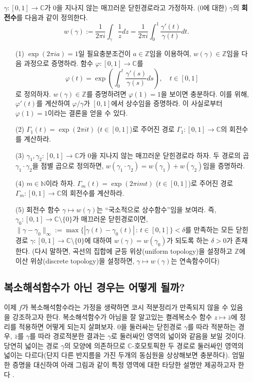 \begin{salt_exercise} \label{ex-3-21}
$\gamma:[0,1]\to\mathbb C$가 $0$을 지나지 않는
매끄러운 닫힌경로라고 가정하자. ($0$에 대한) $\gamma$의 {\bf 회전수}를 
다음과 같이 정의한다.
\[
w(\gamma) := \dfrac1{2\pi i}\int_\gamma \dfrac 1z dz
= \dfrac1{2\pi i}\int_0^1 \dfrac{\gamma'(t)}{\gamma(t)}dt.
\]
\begin{itemize}
\item[(1)] $\exp(2\pi ia)=1$일 필요충분조건이 $a\in\mathbb Z$임을 이용하여,
$w(\gamma)\in\mathbb Z$임을 다음 과정으로 증명하라.
함수 $\varphi:[0,1] \to\mathbb C$를 
\[
\varphi(t) = \exp\left( \int_0^t \dfrac{\gamma'(s)}{\gamma(s)}ds\right),
\quad t\in[0,1]
\]
로 정의하자.  $w(\gamma)\in\mathbb Z$를 증명하려면
$\varphi(1)=1$을 보이면 충분하다.
이를 위해, $\varphi'(t)$를 계산하여 $\varphi/\gamma$가 $[0,1]$에서 상수임을 증명하라.
이 사실로부터 $\varphi(1)=1$이라는 결론을 얻을 수 있다.
\item[(2)] $\Gamma_1(t)=\exp(2\pi it)$ ($t\in[0,1]$)로 주어진 경로 $\Gamma_1:[0,1]\to\mathbb C$의
회전수를 계산하라.
\item[(3)] $\gamma_1, \gamma_2:[0,1]\to\mathbb C$가 $0$을 지나지 않는
매끄러운 닫힌경로라 하자. 두 경로의 곱 $\gamma_1\cdot\gamma_2$을
점별 곱으로 정의하면, $w(\gamma_1\cdot\gamma_2) = w(\gamma_1)+w(\gamma_2)$임을
증명하라.
\item[(4)] $m\in \mathbb N$이라 하자. 
$\Gamma_m(t)=\exp(2\pi imt)$ ($t\in[0,1]$)로 주어진 경로 $\Gamma_m:[0,1]\to\mathbb C$의
회전수를 계산하라.
\item[(5)] 회전수 함수 $\gamma \mapsto w(\gamma)$는
``국소적으로 상수함수''임을 보여라.
즉, $\gamma_0:[0,1]\to\mathbb C\setminus\{0\}$가 매끄러운 닫힌경로이면,
$\|\gamma -\gamma_0\|_\infty := \max\{ |\gamma(t) - \gamma_0(t)| \,:\, t\in[0,1]\}<\delta$를
만족하는 모든 닫힌경로 $\gamma:[0,1]\to\mathbb C\setminus\{0\}$에 대하여
$w(\gamma) = w(\gamma_0)$가 되도록 하는 $\delta>0$가 존재한다.
(다시 말하면, 곡선의 집합에 균등 위상(uniform topology)을 설정하고
$\mathbb Z$에 이산 위상(discrete topology)을  설정하면,
$\gamma \mapsto w(\gamma)$는 연속함수이다)
\end{itemize}
\end{salt_exercise}

\subsection{복소해석함수가 아닌 경우는 어떻게 될까?}

이제 $f$가 복소해석함수라는 가정을 생략하면 코시 적분정리가 만족되지 않을 수 있음을 강조하고자 한다.
복소해석함수가 아님을 잘 알고있는 켤레복소수 함수 $z\mapsto \bar z$에 정리를 적용하면
어떻게 되는지 살펴보자.
$0$을 둘러싸는 닫힌경로 $\gamma$를 따라 적분하는 경우,
$\bar z$를 $\gamma$를 따라 경로적분한 결과는 $\gamma$로 둘러싸인 영역의 넓이와 
같음을 보일 것이다.
당연히 넓이는 경로 $\gamma$의 모양에 의존하므로 $\mathbb C$-호모토픽한 두 경로로
둘러싸인 영역의 넓이는 다르다(단지 다른 반지름을 가진 두개의 동심원을 상상해보면 충분하다).
엄밀한 증명을 대신하여
아래 그림과 같이 특정 영역에 대한 타당한 설명만 제공하고자 한다 . %

